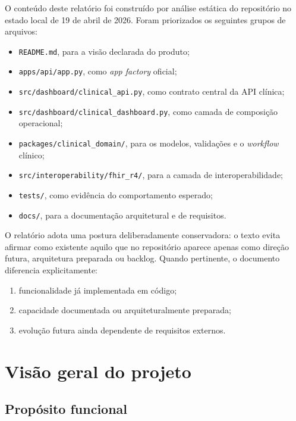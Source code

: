 \documentclass[
    12pt,
    openright,
    oneside,
    a4paper,
    chapter=TITLE,
    section=TITLE,
    brazil,
    sumario=tradicional,
    hidelinks
]{abntex2}
\begin{document}
O conte\'udo deste relat\'orio foi constru\'ido por an\'alise est\'atica do reposit\'orio no estado local de 19 de abril de 2026. Foram priorizados os seguintes grupos de arquivos:

\begin{itemize}
    \item \texttt{README.md}, para a vis\~ao declarada do produto;
    \item \texttt{apps/api/app.py}, como \textit{app factory} oficial;
    \item \texttt{src/dashboard/clinical\_api.py}, como contrato central da API cl\'inica;
    \item \texttt{src/dashboard/clinical\_dashboard.py}, como camada de composi\c{c}\~ao operacional;
    \item \texttt{packages/clinical\_domain/}, para os modelos, valida\c{c}\~oes e o \textit{workflow} cl\'inico;
    \item \texttt{src/interoperability/fhir\_r4/}, para a camada de interoperabilidade;
    \item \texttt{tests/}, como evid\^encia do comportamento esperado;
    \item \texttt{docs/}, para a documenta\c{c}\~ao arquitetural e de requisitos.
\end{itemize}

O relat\'orio adota uma postura deliberadamente conservadora: o texto evita afirmar como existente aquilo que no reposit\'orio aparece apenas como dire\c{c}\~ao futura, arquitetura preparada ou backlog. Quando pertinente, o documento diferencia explicitamente:

\begin{enumerate}
    \item funcionalidade j\'a implementada em c\'odigo;
    \item capacidade documentada ou arquiteturalmente preparada;
    \item evolu\c{c}\~ao futura ainda dependente de requisitos externos.
\end{enumerate}

\chapter{Vis\~ao geral do projeto}

\section{Prop\'osito funcional}
\end{document}
